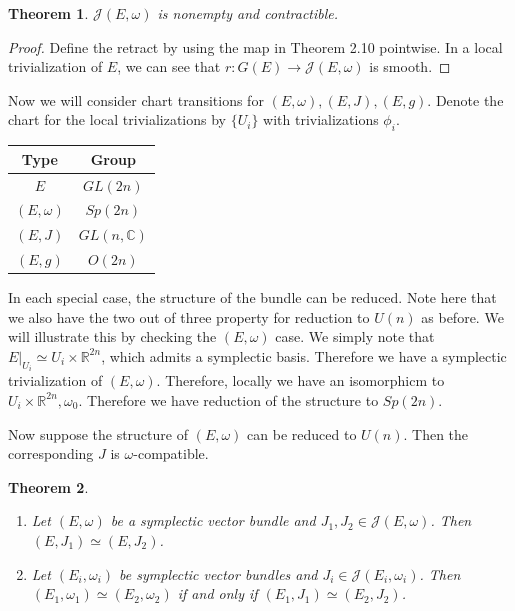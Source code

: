 \documentclass[leqno, openany]{memoir}
\newtheorem{thm}{Theorem}[chapter]
\theoremstyle{definition}
\theoremstyle{remark}
\theoremstyle{plain}
\theoremstyle{definition}
\theoremstyle{remark}
\newcommand{\R}{\mathbb{R}}
\renewcommand{\C}{\mathbb{C}}
\newcommand{\mc}[1]{\mathcal{#1}}
\begin{document}
\begin{thm}
    $\mc{J}(E, \omega)$ is nonempty and contractible.
\end{thm}

\begin{proof}
    Define the retract by using the map in Theorem 2.10 pointwise. In a local trivialization of $E$, we can see that $r: G(E) \to \mc{J}(E, \omega)$ is smooth.
\end{proof}

Now we will consider chart transitions for $(E, \omega), (E, J), (E, g)$. Denote the chart for the local trivializations by $\{U_i\}$ with trivializations $\phi_i$.
\begin{center}
    \begin{tabular}{cc}
        \toprule
        Type & Group \\
        \midrule
        $E$ & $GL(2n)$ \\
        $(E,\omega)$ & $Sp(2n)$ \\
        $(E,J)$ & $GL(n, \C)$ \\
        $(E,g)$ & $O(2n)$ \\
        \bottomrule
    \end{tabular}
\end{center}
In each special case, the structure of the bundle can be reduced. Note here that we also have the two out of three property for reduction to $U(n)$ as before. We will illustrate this by checking the $(E, \omega)$ case. We simply note that $E|_{U_i} \simeq U_i \times \R^{2n}$, which admits a symplectic basis. Therefore we have a symplectic trivialization of $(E, \omega)$. Therefore, locally we have an isomorphicm to $U_i \times \R^{2n}, \omega_0$. Therefore we have reduction of the structure to $Sp(2n)$.

Now suppose the structure of $(E, \omega)$ can be reduced to $U(n)$. Then the corresponding $J$ is $\omega$-compatible.

\begin{thm}
    \begin{enumerate}
        \item Let $(E, \omega)$ be a symplectic vector bundle and $J_1, J_2 \in \mc{J}(E, \omega)$. Then $(E, J_1) \simeq (E, J_2)$.
        \item Let $(E_i, \omega_i)$ be symplectic vector bundles and $J_i \in \mc{J}(E_i, \omega_i)$. Then $(E_1, \omega_1) \simeq (E_2, \omega_2)$ if and only if $(E_1, J_1) \simeq (E_2, J_2)$.
    \end{enumerate}
\end{thm}
\end{document}
